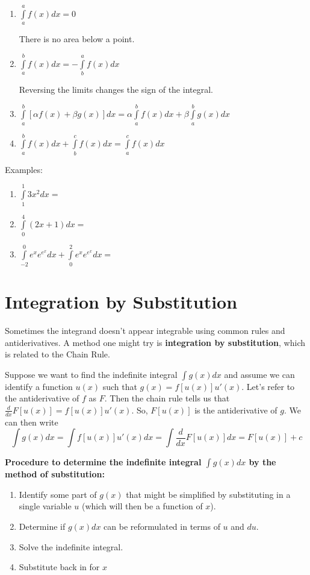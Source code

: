 \documentclass[]{book}
\providecommand{\tightlist}{%
  \setlength{\itemsep}{0pt}\setlength{\parskip}{0pt}}
\theoremstyle{definition}
\theoremstyle{definition}
\theoremstyle{definition}
\theoremstyle{remark}
\begin{document}
\begin{enumerate}
        \item \parbox[t]{2in}{$\int\limits_a^a f(x)dx=0$}\parbox[t]{4in}{There is no area below a point.}
        \item \parbox[t]{2in}{$\int\limits_a^b f(x)dx=-\int\limits_b^a f(x)dx$}\parbox[t]{4in}{Reversing the limits changes the sign of the integral.}
        \item $\int\limits_a^b [\alpha f(x)+\beta g(x)]dx = \alpha \int\limits_a^b f(x)dx + \beta \int\limits_a^b g(x)dx$
        \item $\int\limits_a^b f(x) dx +\int\limits_b^c f(x)dx = \int\limits_a^c f(x)dx$
\end{enumerate}

\begin{framed}
Examples:
\begin{enumerate}
        \item $\int\limits_1^1 3x^2 dx = $ 
        \item $\int\limits_0^4 (2x+1)dx= $ 
        \item $\int\limits_{-2}^0 e^x e^{e^x} dx + \int\limits_0^2 e^x e^{e^x} dx =$
    \end{enumerate}
\end{framed}

\section{Integration by Substitution}\label{integration-by-substitution}

Sometimes the integrand doesn't appear integrable using common rules and
antiderivatives. A method one might try is \textbf{integration by
substitution}, which is related to the Chain Rule.

Suppose we want to find the indefinite integral \(\int g(x)dx\) and
assume we can identify a function \(u(x)\) such that
\(g(x)=f[u(x)]u'(x)\). Let's refer to the antiderivative of \(f\) as
\(F\). Then the chain rule tells us that
\(\frac{d}{dx} F[u(x)]=f[u(x)]u'(x)\). So, \(F[u(x)]\) is the
antiderivative of \(g\). We can then write
\[\int g(x) dx= \int f[u(x)]u'(x)dx = \int \frac{d}{dx} F[u(x)]dx = F[u(x)]+c\]

\textbf{Procedure to determine the indefinite integral \(\int g(x)dx\)
by the method of substitution:}

\begin{enumerate}
\def\labelenumi{\arabic{enumi}.}
\tightlist
\item
  Identify some part of \(g(x)\) that might be simplified by
  substituting in a single variable \(u\) (which will then be a function
  of \(x\)).
\item
  Determine if \(g(x)dx\) can be reformulated in terms of \(u\) and
  \(du\).
\item
  Solve the indefinite integral.
\item
  Substitute back in for \(x\)
\end{enumerate}
\end{document}
